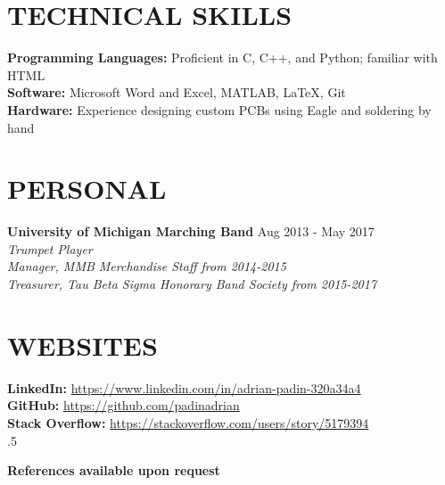 \documentclass[margin,11pt]{res}
\begin{document}
\begin{resume}
\vspace{-10pt}
\section{TECHNICAL SKILLS}
\textbf{Programming Languages:}
Proficient in C, C++, and Python; familiar with HTML\\
\textbf{Software:}
Microsoft Word and Excel, MATLAB, LaTeX, Git\\
\textbf{Hardware:}
Experience designing custom PCBs using Eagle and soldering by hand

\vspace{-10pt}
\section{PERSONAL}
\textbf{University of Michigan Marching Band} \hfill Aug 2013 - May 2017\\
\textsl{Trumpet Player}\\
\textsl{Manager, MMB Merchandise Staff from 2014-2015}\\
\textsl{Treasurer, Tau Beta Sigma Honorary Band Society from 2015-2017}\\

\vspace{-20pt}
\section{WEBSITES}
\textbf{LinkedIn:}
\href{https://www.linkedin.com/in/adrian-padin-320a34a4}{https://www.linkedin.com/in/adrian-padin-320a34a4}\\
\textbf{GitHub:}
\href{https://github.com/padinadrian}{https://github.com/padinadrian}\\
\textbf{Stack Overflow:}
\href{https://stackoverflow.com/users/story/5179394}{https://stackoverflow.com/users/story/5179394}\\


\vspace{10pt}
\moveleft.5\hoffset\centerline{\large\bf References available upon request}

\end{resume}
\end{document}
